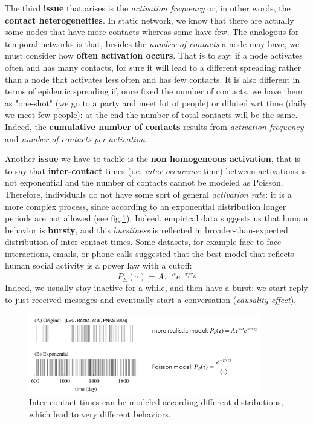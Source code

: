 \documentclass[../main/main.tex]{subfiles}
\begin{document}
The third \textbf{issue} that arises is the \textit{activation frequency} or, in other words, the \textbf{contact heterogeneities}. In static network, we know that there are actually some nodes that have more contacts whereas some have few. The analogous for temporal networks is that, besides the \textit{number of contacts} a node may have, we must consider how \textbf{often activation occurs}.
That is to say: if a node activates often and has many contacts, for sure it will lead to a different spreading rather than a node that activates less often and has few contacts. It is also different in terms of epidemic spreading if, once fixed the number of contacts, we have them as "one-shot" (we go to a party and meet lot of people) or diluted wrt time (daily we meet few people): at the end the number of total contacts will be the same. Indeed, the \textbf{cumulative number of contacts} results from \textit{activation frequency} and \textit{number of contacts per activation}.


Another \textbf{issue} we have to tackle is the \textbf{non homogeneous activation}, that is to say that \textbf{inter-contact} times (i.e. \textit{inter-occurence} time) between activations is not exponential and the number of contacts cannot be modeled as Poisson. Therefore, individuals do not have some sort of general \textit{activation rate}: it is a more complex process, since according to an exponential distribution longer periods are not allowed (see fig.\ref{fig:17_08}). Indeed, empirical data suggests us that human behavior is \textbf{bursty}, and this \textit{burstiness} is reflected in broader-than-expected distribution of inter-contact times. Some datasets, for example face-to-face interactions, emails, or phone calls suggested that the best model that reflects human social activity is a power law with a cutoff:
\begin{equation*}
    P_{E} ( \tau ) = A \tau ^{-\alpha} e^{-\tau/\tau_E}
\end{equation*}
Indeed, we usually stay inactive for a while, and then have a burst: we start reply to just received messages and eventually start a conversation (\textit{causality effect}).

\begin{figure}[h!]
\centering
\includegraphics[width=0.9\textwidth]{../lessons/image/17/image08.png}
\caption{\label{fig:17_08} Inter-contact times can be modeled according different distributions, which lead to very different behaviors. }
\end{figure}
\end{document}
